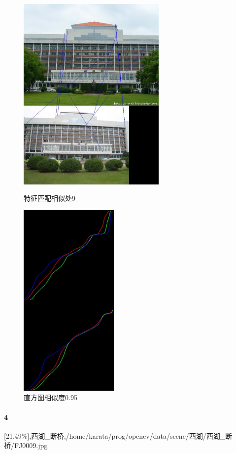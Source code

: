 \begin{figure}[htb]
\begin{minipage}[t]{0.5\linewidth}
\centering
\includegraphics[height=3.8in]{玉泉图书馆.jpg.d/im3sift.jpg}
\caption{特征匹配相似处9}
\label{fig:side:a}
\end{minipage}%
\begin{minipage}[t]{0.5\linewidth}
\centering
\includegraphics[height=3.8in]{玉泉图书馆.jpg.d/im3hist2.jpg}
\caption{直方图相似度0.95}
\label{fig:side:a}
\end{minipage}%
\end{figure}

\clearpage
\paragraph{4}
[21.49\%],西湖_断桥,/home/karata/prog/opencv/data/scene/西湖/西湖_断桥/FJ0009.jpg

